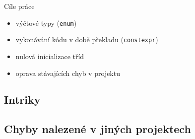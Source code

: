 \documentclass[11pt]{beamer}
\begin{document}



\begin{frame}{Cíle práce}
\begin{itemize}
\pause \item výčtové typy (\texttt{enum})
\pause \item vykonávání kódu v době překladu (\texttt{constexpr})
\pause \item nulová inicializace tříd
\pause \item oprava stávajících chyb v projektu
\end{itemize}
\end{frame}

\subsection{Intriky}

\subsection{Chyby nalezené v jiných projektech}


\end{document}
